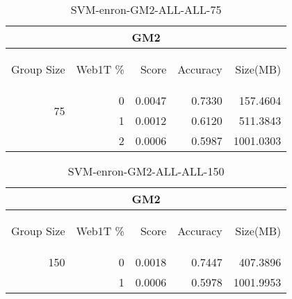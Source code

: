 \begin{center}
\begin{table}[htbp] 
 \begin{center}
\begin{tabular}{ | r | r | r | r | r |}
\hline
\multicolumn{5}{|c|}{GM2}\\
\hline
\begin{sideways}Group Size\end{sideways} & \begin{sideways}Web1T \%\end{sideways} & \begin{sideways}Score\end{sideways} & \begin{sideways}Accuracy\end{sideways} & \begin{sideways}Size(MB)\end{sideways}\\
\hline
\multirow{2}{*}{75}
 & 0 & 0.0047 & 0.7330 & 157.4604\\ \cline{2-5}
 & 1 & 0.0012 & 0.6120 & 511.3843\\ \cline{2-5}
 & 2 & 0.0006 & 0.5987 & 1001.0303\\ \cline{2-5}
\hline
\end{tabular}
\caption{SVM-enron-GM2-ALL-ALL-75}
\label{table:SVM-enron-GM2-ALL-ALL-75}
\end{center}
 \end{table}
\end{center}

\begin{center}
\begin{table}[htbp] 
 \begin{center}
\begin{tabular}{ | r | r | r | r | r |}
\hline
\multicolumn{5}{|c|}{GM2}\\
\hline
\begin{sideways}Group Size\end{sideways} & \begin{sideways}Web1T \%\end{sideways} & \begin{sideways}Score\end{sideways} & \begin{sideways}Accuracy\end{sideways} & \begin{sideways}Size(MB)\end{sideways}\\
\hline
\multirow{1}{*}{150}
 & 0 & 0.0018 & 0.7447 & 407.3896\\ \cline{2-5}
 & 1 & 0.0006 & 0.5978 & 1001.9953\\ \cline{2-5}
\hline
\end{tabular}
\caption{SVM-enron-GM2-ALL-ALL-150}
\label{table:SVM-enron-GM2-ALL-ALL-150}
\end{center}
 \end{table}
\end{center}

